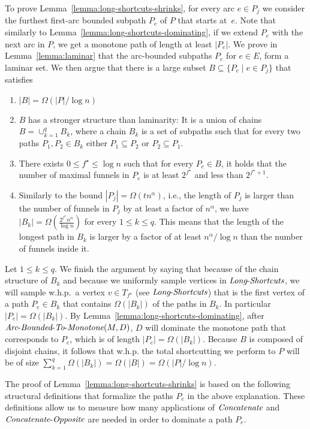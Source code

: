 \documentclass[11pt]{article}
\newcommand{\Concat}{\mbox{{\it Concatenate}}}
\newcommand{\CO}{\mbox{{\it Concatenate}-{\it Opposite}}}
\newcommand{\LS}{\mbox{{\it Long}-{\it Shortcuts}}}
\newcommand{\Extend}{\mbox{{\it Arc}-{\it Bounded}-{\it To}-{\it Monotone}}}
\begin{document}
To prove Lemma~\ref{lemma:long-shortcuts-shrinks}, for every arc $e\in P_j$ we consider the furthest first-arc bounded subpath $P_e$ of $P$ that starts at~$e$. Note that similarly to Lemma~\ref{lemma:long-shortcuts-dominating}, if we extend $P_e$ with the next arc in $P$, we get a monotone path of length at least $|P_e|$. We prove in Lemma~\ref{lemma:laminar} that the arc-bounded subpaths $P_e$ for $e\in E$, form a laminar set. We then argue that there is a large subset $B \subseteq \{P_e \mid e\in P_j\}$ that satisfies

\begin{enumerate}
    \item $|B| = \Omega(|P|/\log n)$
    \item $B$ has a stronger structure than laminarity: It is a union of chains $B = \cup_{k=1}^q B_k$, where a chain $B_k$ is a set of subpaths such that for every two paths $P_1,P_2\in B_k$ either $P_1\subseteq P_2$ or $P_2\subseteq P_1$.
    \item There exists $0\le f^\star \le \log n$ such that for every  $P_e\in B$, it holds that the number of maximal funnels in $P_e$ is at least $2^{f^\star}$ and less than $2^{f^\star +1 }$.
    \item Similarly to the bound $|P_j| = \Omega(t n^\alpha)$, i.e., the length of $P_j$ is larger than the number of funnels in $P_j$ by at least a factor of $n^\alpha$, we have $|B_k| = \Omega\left( \frac{2^{f^\star} n^\alpha}{\log n} \right)$ for every $1\le k \le q$. This means that the length of the longest path in $B_k$ is larger by a factor of at least $n^\alpha /\log n$ than the number of funnels inside it.
\end{enumerate}


Let $1\le k \le q$. We finish the argument by saying that because of the chain structure of $B_k$ and because we uniformly sample vertices in $\LS$, we will sample w.h.p.\ a vertex $v \in T_{f^\star}$ (see $\LS$) that is the first vertex of a path $P_e  \in B_k$  
that contains $\Omega(|B_k|)$ of the paths in $B_k$. In particular $|
P_e| = \Omega(|B_k|)$. By Lemma~\ref{lemma:long-shortcuts-dominating}, after $\Extend(M,D)$, $D$ will dominate the monotone path that corresponds to $P_e$, which is of length $|P_e| = \Omega(|B_k|)$. Because $B$ is composed of disjoint chains, it follows that w.h.p. the total shortcutting we perform to $P$ will be of size $\sum_{k=1}^q \Omega(|B_k|) = \Omega(|B|) = \Omega(|P|/\log n)$. 


The proof of Lemma~\ref{lemma:long-shortcuts-shrinks} is based on the following structural definitions that formalize the paths $P_e$ in the above explanation.
These definitions allow us to measure how many applications of $\Concat$ and $\CO$ are needed in order to dominate a path $P_e$.
\end{document}
